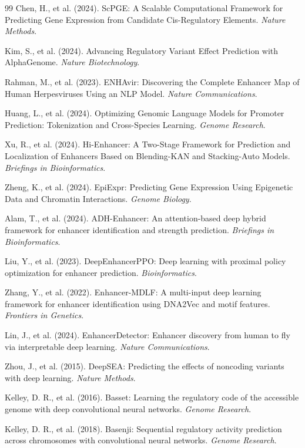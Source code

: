 \documentclass[11pt,a4paper]{article}
\begin{document}
\begin{thebibliography}{99}
Chen, H., et al. (2024). ScPGE: A Scalable Computational Framework for Predicting Gene Expression from Candidate Cis-Regulatory Elements. \textit{Nature Methods}.

Kim, S., et al. (2024). Advancing Regulatory Variant Effect Prediction with AlphaGenome. \textit{Nature Biotechnology}.

Rahman, M., et al. (2023). ENHAvir: Discovering the Complete Enhancer Map of Human Herpesviruses Using an NLP Model. \textit{Nature Communications}.

Huang, L., et al. (2024). Optimizing Genomic Language Models for Promoter Prediction: Tokenization and Cross-Species Learning. \textit{Genome Research}.

Xu, R., et al. (2024). Hi-Enhancer: A Two-Stage Framework for Prediction and Localization of Enhancers Based on Blending-KAN and Stacking-Auto Models. \textit{Briefings in Bioinformatics}.

Zheng, K., et al. (2024). EpiExpr: Predicting Gene Expression Using Epigenetic Data and Chromatin Interactions. \textit{Genome Biology}.

Alam, T., et al. (2024). ADH-Enhancer: An attention-based deep hybrid framework for enhancer identification and strength prediction. \textit{Briefings in Bioinformatics}.

Liu, Y., et al. (2023). DeepEnhancerPPO: Deep learning with proximal policy optimization for enhancer prediction. \textit{Bioinformatics}.

Zhang, Y., et al. (2022). Enhancer-MDLF: A multi-input deep learning framework for enhancer identification using DNA2Vec and motif features. \textit{Frontiers in Genetics}.

Lin, J., et al. (2024). EnhancerDetector: Enhancer discovery from human to fly via interpretable deep learning. \textit{Nature Communications}.

Zhou, J., et al. (2015). DeepSEA: Predicting the effects of noncoding variants with deep learning. \textit{Nature Methods}.

Kelley, D. R., et al. (2016). Basset: Learning the regulatory code of the accessible genome with deep convolutional neural networks. \textit{Genome Research}.

Kelley, D. R., et al. (2018). Basenji: Sequential regulatory activity prediction across chromosomes with convolutional neural networks. \textit{Genome Research}.


\end{thebibliography}
\end{document}
